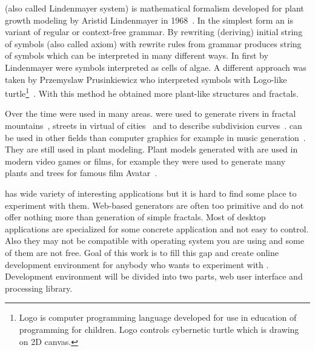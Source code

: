 

\lsystem (also called Lindenmayer system) is mathematical formalism developed for plant growth modeling by Aristid Lindenmayer in 1968~\cite{Lin68}.
In the simplest form an \lsystem is variant of regular or \mbox{context-free} grammar.
By rewriting (deriving) initial string of symbols (also called axiom) with rewrite rules from grammar \lsystem produces string of symbols which can be interpreted in many different ways.
In first \lsystems by Lindenmayer were symbols interpreted as cells of algae.
A different approach was taken by Przemyslaw Prusinkiewicz who interpreted \lsystem symbols with \mbox{Logo-like} turtle\footnote{
	Logo is computer programming language developed for use in education of programming for children.
	Logo controls cybernetic turtle which is drawing on 2D canvas.}~\cite{Pru85}.
With this method he obtained more plant-like structures and fractals.~\cite{CD93}

Over the time \lsystems were used in many areas.
\lsystems were used to generate rivers in fractal mountains~\cite{PH93}, streets in virtual of cities~\cite{PM01} and to describe subdivision curves~\cite{PSSK03}.
\lsystems can be used in other fields than computer graphics for example in music generation~\cite{HCJ99, Man06}.
They are still used in plant modeling.
Plant models generated with \lsystems are used in modern video games or films, for example they were used to generate many plants and trees for famous film Avatar~\cite{Wor08, Dun10}.

\lsystems has wide variety of interesting applications but it is hard to find some place to experiment with them.
Web-based \lsystem generators are often too primitive and do not offer nothing more than generation of simple fractals.
Most of desktop applications are specialized for some concrete \lsystem application and not easy to control.
Also they may not be compatible with operating system you are using and some of them are not free.
Goal of this work is to fill this gap and create online development environment for anybody who wants to experiment with \lsystems.
Development environment will be divided into two parts, web user interface and \lsystem processing library.

